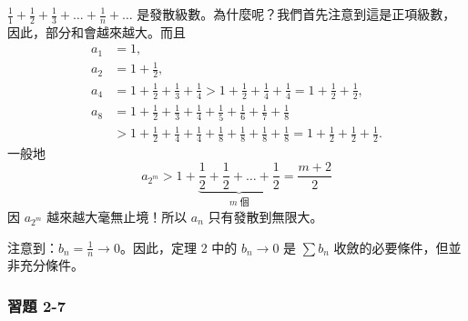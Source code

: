 \begin{example}\label{ex:b2_2-6-1}
$\frac{1}{1}+\frac{1}{2}+\frac{1}{3}+\dots+\frac{1}{n}+\dots$ 是發散級數。為什麼呢？我們首先注意到這是正項級數，因此，部分和會越來越大。而且
\begin{align*}
a_1 &= 1, \\
a_2 &= 1+\frac{1}{2}, \\
a_4 &= 1+\frac{1}{2}+\frac{1}{3}+\frac{1}{4} > 1+\frac{1}{2}+\frac{1}{4}+\frac{1}{4} = 1+\frac{1}{2}+\frac{1}{2}, \\
a_8 &= 1+\frac{1}{2}+\frac{1}{3}+\frac{1}{4}+\frac{1}{5}+\frac{1}{6}+\frac{1}{7}+\frac{1}{8} \\
&> 1+\frac{1}{2}+\frac{1}{4}+\frac{1}{4}+\frac{1}{8}+\frac{1}{8}+\frac{1}{8}+\frac{1}{8} = 1+\frac{1}{2}+\frac{1}{2}+\frac{1}{2}.
\end{align*}
一般地
\[
a_{2^m} > 1 + \underbrace{\frac{1}{2}+\frac{1}{2}+\dots+\frac{1}{2}}_{m\text{ 個}} = \frac{m+2}{2}
\]
因 $a_{2^m}$ 越來越大毫無止境！所以 $a_n$ 只有發散到無限大。

注意到：$b_n = \frac{1}{n} \to 0$。因此，定理 2 中的 $b_n \to 0$ 是 $\sum b_n$ 收斂的必要條件，但並非充分條件。
\end{example}

\subsubsection*{習題 2-7}


